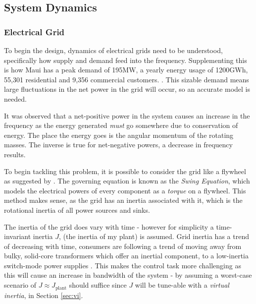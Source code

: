 \subsection{System Dynamics}
\label{sec:sysdyn}
\subsubsection{Electrical Grid}

To begin the design, dynamics of electrical grids need to be understood, specifically how supply and demand feed into the frequency.
Supplementing this is how Maui has a {peak demand of 195MW, a yearly energy usage of 1200GWh}, 55,301 residential and 9,356 commercial customers. \cite{power:maui}.
This sizable demand means large fluctuations in the net power in the grid will occur, so an accurate model is needed.

It was observed that a net-positive power in the system causes an increase in the frequency as the energy generated \emph{must} go somewhere due to conservation of energy.
The place the energy goes is the angular momentum of the rotating masses.
The inverse is true for net-negative powers, a decrease in frequency results.

To begin tackling this problem, it is possible to consider the grid like a flywheel as suggested by \cite{power:swing}.
The governing equation is known as the \emph{Swing Equation}, which models the electrical powers of every component as a \emph{torque} on a flywheel.
This method makes sense, as the grid has an inertia associated with it, which is the rotational inertia of all power sources and sinks.

The inertia of the grid does vary with time - however for simplicity a time-invariant inertia $J$, (the inertia of my plant) is assumed.
Grid inertia has a trend of decreasing with time, consumers are following a trend of moving away from bulky, solid-core transformers which offer an inertial component, to a low-inertia switch-mode power supplies \cite{power:vi}.
This makes the control task more challenging as this will cause an increase in bandwidth of the system - by assuming a worst-case scenario of $J \approx J_{\text{plant}}$ should suffice since $J$ will be tune-able with a \emph{virtual inertia}, in Section \ref{sec:vi}.

